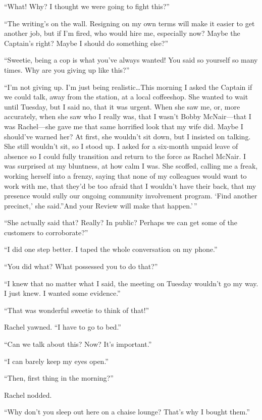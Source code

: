 ``What! Why? I thought we were going to fight this?''

``The writing's on the wall. Resigning on my own terms will make it
easier to get another job, but if I'm fired, who would hire me,
especially now? Maybe the Captain's right? Maybe I should do something
else?''

``Sweetie, being a cop is what you've always wanted! You said so
yourself so many times. Why are you giving up like this?''

``I'm not giving up. I'm just being realistic\ldots This morning I asked
the Captain if we could talk, away from the station, at a local
coffeeshop. She wanted to wait until Tuesday, but I said no, that it was
urgent. When she saw me, or, more accurately, when she saw who I really
was, that I wasn't Bobby McNair---that I was Rachel---she gave me that
same horrified look that my wife did. Maybe I should've warned her? At
first, she wouldn't sit down, but I insisted on talking. She still
wouldn't sit, so I stood up. I asked for a six-month unpaid leave of
absence so I could fully transition and return to the force as Rachel
McNair. I was surprised at my bluntness, at how calm I was. She scoffed,
calling me a freak, working herself into a frenzy, saying that none of
my colleagues would want to work with me, that they'd be too afraid that
I wouldn't have their back, that my presence would sully our ongoing
community involvement program. `Find another precinct,' she said.''And
your Review will make that happen.'\,''

``She actually said that? Really? In public? Perhaps we can get some of
the customers to corroborate?''

``I did one step better. I taped the whole conversation on my phone.''

``You did what? What possessed you to do that?''

``I knew that no matter what I said, the meeting on Tuesday wouldn't go
my way. I just knew. I wanted some evidence.''

``That was wonderful sweetie to think of that!''

Rachel yawned. ``I have to go to bed.''

``Can we talk about this? Now? It's important.''

``I can barely keep my eyes open.''

``Then, first thing in the morning?''

Rachel nodded.

``Why don't you sleep out here on a chaise lounge? That's why I bought
them.''


